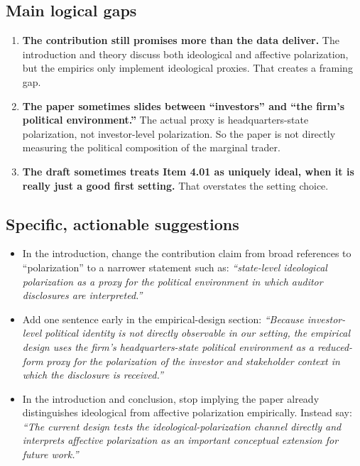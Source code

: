 \documentclass[12pt]{article}
\begin{document}
\subsection*{Main logical gaps}
\begin{enumerate}[label=\textbf{\arabic*.}, leftmargin=1.75em]
    \item \textbf{The contribution still promises more than the data deliver.} The introduction and theory discuss both ideological and affective polarization, but the empirics only implement ideological proxies. That creates a framing gap.
    \item \textbf{The paper sometimes slides between ``investors'' and ``the firm's political environment.''} The actual proxy is headquarters-state polarization, not investor-level polarization. So the paper is not directly measuring the political composition of the marginal trader.
    \item \textbf{The draft sometimes treats Item 4.01 as uniquely ideal, when it is really just a good first setting.} That overstates the setting choice.
\end{enumerate}

\subsection*{Specific, actionable suggestions}
\begin{itemize}[leftmargin=1.5em]
    \item In the introduction, change the contribution claim from broad references to ``polarization'' to a narrower statement such as: \emph{``state-level ideological polarization as a proxy for the political environment in which auditor disclosures are interpreted.''}
    \item Add one sentence early in the empirical-design section: \emph{``Because investor-level political identity is not directly observable in our setting, the empirical design uses the firm's headquarters-state political environment as a reduced-form proxy for the polarization of the investor and stakeholder context in which the disclosure is received.''}
    \item In the introduction and conclusion, stop implying the paper already distinguishes ideological from affective polarization empirically. Instead say: \emph{``The current design tests the ideological-polarization channel directly and interprets affective polarization as an important conceptual extension for future work.''}
\end{itemize}
\end{document}
